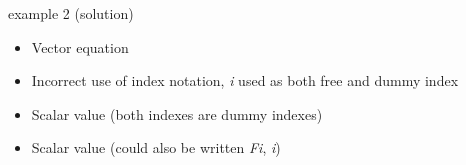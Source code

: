 \documentclass[
  letterpaper,
  ignorenonframetext,
  aspectratio=43,
  handout,
  12pt]{beamer}
\providecommand{\tightlist}{%
  \setlength{\itemsep}{0pt}\setlength{\parskip}{0pt}}
\providecommand{\tightlist}{%
\setlength{\itemsep}{0pt}\setlength{\parskip}{0pt}}
\begin{document}
\begin{frame}{example 2 (solution)}
\protect\hypertarget{example-2-solution}{}
\begin{itemize}
\tightlist
\item
  Vector equation
\item
  Incorrect use of index notation, \emph{i} used as both free and dummy
  index
\item
  Scalar value (both indexes are dummy indexes)
\item
  Scalar value (could also be written \emph{F}\emph{i}, \emph{i})
\end{itemize}
\end{frame}
\end{document}
